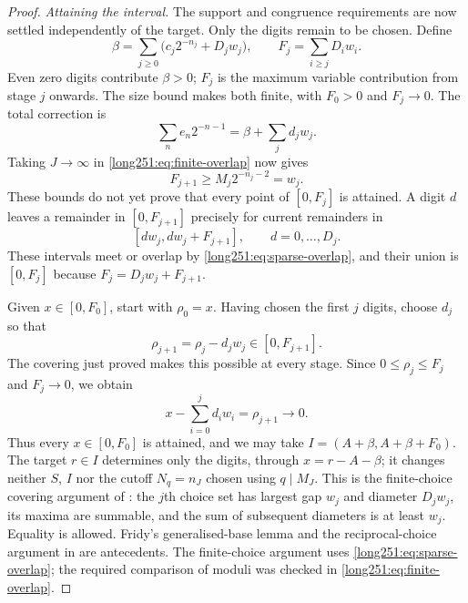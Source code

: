 \documentclass[11pt]{article}
\begin{document}
\begin{proof}
\par\medskip\noindent\emph{Attaining the interval.}
The support and congruence requirements are now settled independently
of the target.  Only the digits remain to be chosen.  Define
\[
 \beta=\sum_{j\ge0}\bigl(c_j2^{-n_j}+D_jw_j\bigr),\qquad
 F_j=\sum_{i\ge j}D_iw_i.
\]
Even zero digits contribute $\beta>0$; $F_j$ is the maximum variable
contribution from stage $j$ onwards.  The size bound makes both finite,
with $F_0>0$ and $F_j\to0$.  The total correction is
\begin{equation}\label{long251:eq:sparse-baseline}
 \sum_ne_n2^{-n-1}=\beta+\sum_jd_jw_j.
\end{equation}
Taking $J\to\infty$ in \eqref{long251:eq:finite-overlap} now gives
\begin{equation}\label{long251:eq:sparse-overlap}
 F_{j+1}\ge M_j2^{-n_j-2}=w_j.
\end{equation}
These bounds do not yet prove that every point of $[0,F_j]$ is
attained.  A digit $d$ leaves a remainder in $[0,F_{j+1}]$ precisely
for current remainders in
\[
 [dw_j,dw_j+F_{j+1}],\qquad d=0,\ldots,D_j.
\]
These intervals meet or overlap by \eqref{long251:eq:sparse-overlap}, and their union
is $[0,F_j]$ because $F_j=D_jw_j+F_{j+1}$.

Given $x\in[0,F_0]$, start with $\rho_0=x$.  Having chosen the first
$j$ digits, choose $d_j$ so that
\[
 \rho_{j+1}=\rho_j-d_jw_j\in[0,F_{j+1}].
\]
The covering just proved makes this possible at every stage.  Since $0\le\rho_j\le F_j$ and $F_j\to0$, we obtain
\[
 x-\sum_{i=0}^{j}d_iw_i=\rho_{j+1}\longrightarrow0.
\]
Thus every $x\in[0,F_0]$ is attained, and we may take
$I=(A+\beta,A+\beta+F_0)$.  The target $r\in I$ determines only the
digits, through $x=r-A-\beta$; it changes neither $S$, $I$ nor the
cutoff $N_q=n_J$ chosen using $q\mid M_J$.
This is the finite-choice covering argument of
\cite[Lemma~4]{crmarickovac2025}: the $j$th choice set has largest gap
$w_j$ and diameter $D_jw_j$, its maxima are summable, and the sum of
subsequent diameters is at least $w_j$.  Equality is allowed.
Fridy's generalised-base lemma
\cite[p.~194]{fridy1966} and the reciprocal-choice argument in
\cite[Lemma~5.1]{kovactao2024} are antecedents.  The finite-choice argument
uses \eqref{long251:eq:sparse-overlap}; the required comparison of moduli
was checked in \eqref{long251:eq:finite-overlap}.


\end{proof}
\end{document}
